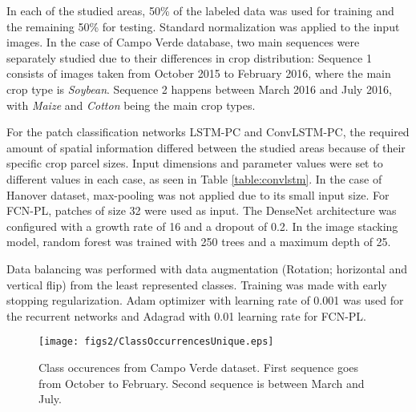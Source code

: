 In each of the studied areas, 50\% of the labeled data was used for training and the remaining 50\% for testing. Standard normalization was applied to the input images. In the case of Campo Verde database, two main sequences were separately studied due to their differences in crop distribution: Sequence 1 consists of images taken from October 2015 to February 2016, where the main crop type is \textit{Soybean}. Sequence 2 happens between March 2016 and July 2016, with \textit{Maize} and \textit{Cotton} being the main crop types. 

For the patch classification networks LSTM-PC and ConvLSTM-PC, the required amount of spatial information differed between the studied areas because of their specific crop parcel sizes. Input dimensions and parameter values were set to different values in each case, as seen in Table \ref{table:convlstm}. In the case of Hanover dataset, max-pooling was not applied due to its small input size. For FCN-PL, patches of size 32 were used as input. The DenseNet architecture was configured with a growth rate of 16 and a dropout of 0.2. In the image stacking model, random forest was trained with 250 trees and a maximum depth of 25.

Data balancing was performed with data augmentation (Rotation; horizontal and vertical flip) from the least represented classes. Training was made with early stopping regularization. Adam optimizer with learning rate of 0.001 was used for the recurrent networks and Adagrad with 0.01 learning rate for FCN-PL.  
\begin{figure}[t!]
\centering
\texttt{[image: figs2/ClassOccurrencesUnique.eps]}
\caption{Class occurences from Campo Verde dataset. First sequence goes from October to February. Second sequence is between March and July.}
\label{fig:labels}
\end{figure}
